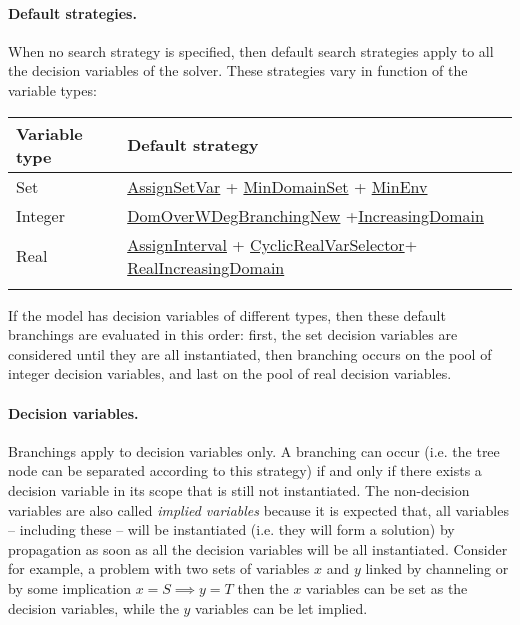 \paragraph{Default strategies.}
When no search strategy is specified, then default search strategies apply to all the decision variables of the solver.
These strategies vary in function of the variable types: 

\noindent\begin{tabular}{p{.25\linewidth}p{.7\linewidth}}
\hline
Variable type &  Default strategy \\
\hline
Set &   \hyperlink{assignsetvar:assignsetvarbranchstrat}{AssignSetVar} + \hyperlink{mindomset:mindomsetvarselector}{MinDomainSet} + \hyperlink{minenv:minenvvalselector}{MinEnv} \\
Integer & \hyperlink{domoverwdeg:domoverwdegbranchstrat}{DomOverWDegBranchingNew} +\hyperlink{increasingdomain:increasingdomainvaliterator}{IncreasingDomain}\\
 Real &  \hyperlink{assigninterval:assignintervalbranchstrat}{AssignInterval} + \hyperlink{cyclicrealvarselector:cyclicrealvarselectorvarselector}{CyclicRealVarSelector}+ \hyperlink{realincreasingdomain:realincreasingdomainvaliterator}{RealIncreasingDomain} \\
\hline\\
\end{tabular}
If the model has decision variables of different types, then these default branchings are evaluated in this order: first, the set decision variables are considered until they are all instantiated, then branching occurs on the pool of integer decision variables, and last on the pool of real decision variables.

\paragraph{Decision variables.}
Branchings apply to decision variables only. A branching can occur (i.e. the tree node can be separated according to this strategy) if and only if there exists a decision variable in its scope that is still not instantiated.
The non-decision variables are also called \emph{implied variables} because it is expected that, all variables -- including these -- will be instantiated (i.e. they will form a solution) by propagation as soon as all the decision variables will be all instantiated. Consider for example, a problem with two sets of variables $x$ and $y$ linked by channeling or by some implication $x=S\implies y=T$ then the $x$ variables can be set as the decision variables, while the $y$ variables can be let implied. 


